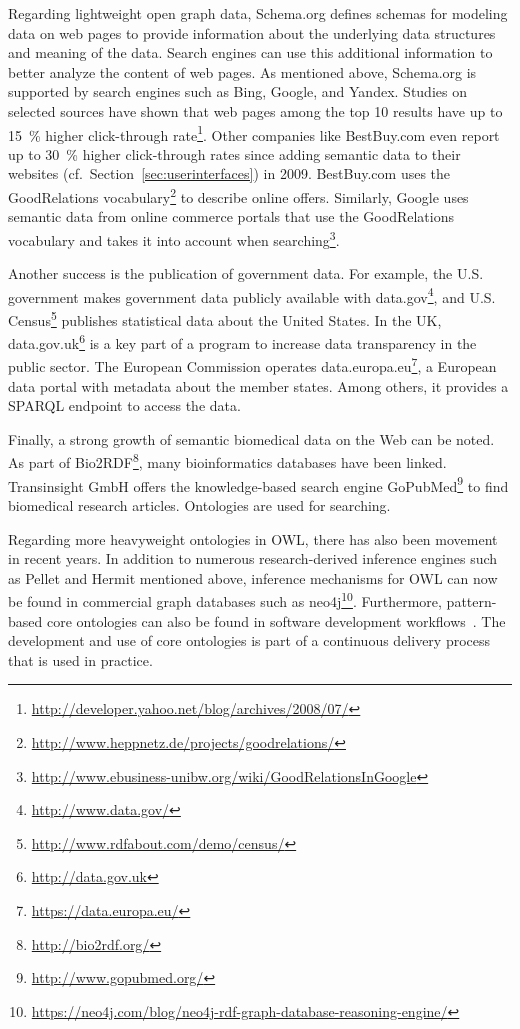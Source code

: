\documentclass[a4paper,USenglish]{tgdk-v2021}
\newcommand{\myurl}[1]{\footnote{\url{#1}}}
\begin{document}
Regarding lightweight open graph data, Schema.org defines schemas for modeling data on web pages to provide information about the underlying data structures and meaning of the data.
Search engines can use this additional information to better analyze the content of web pages.
As mentioned above, Schema.org is supported by search engines such as Bing, Google, and Yandex. 
Studies on selected sources have shown that web pages among the top 10 results have up to 15~\% higher click-through rate\footnote{\url{http://developer.yahoo.net/blog/archives/2008/07/}}.
Other companies like BestBuy.com even report up to 30~\% higher click-through rates since adding semantic data to their websites (cf.~Section~\ref{sec:userinterfaces}) in 2009.
BestBuy.com uses the GoodRelations vocabulary\myurl{http://www.heppnetz.de/projects/goodrelations/} to describe online offers.
Similarly, Google uses semantic data from online commerce portals that use the GoodRelations vocabulary and takes it into account when searching\footnote{\url{http://www.ebusiness-unibw.org/wiki/GoodRelationsInGoogle}}. 

Another success is the publication of government data.
For example, the U.S. government makes government data publicly available with data.gov\myurl{http://www.data.gov/}, and U.S. Census\myurl{http://www.rdfabout.com/demo/census/} publishes statistical data about the United States.
In the UK, data.gov.uk\myurl{http://data.gov.uk} is a key part of a program to increase data transparency in the public sector.
The European Commission operates data.europa.eu\myurl{https://data.europa.eu/}, a European data portal with metadata about the member states.
Among others, it provides a SPARQL endpoint to access the data.

Finally, a strong growth of semantic biomedical data on the Web can be noted.
As part of Bio2RDF\myurl{http://bio2rdf.org/}, many bioinformatics databases have been linked.
Transinsight GmbH offers the knowledge-based search engine GoPubMed\myurl{http://www.gopubmed.org/} to find biomedical research articles.
Ontologies are used for searching.

Regarding more heavyweight ontologies in OWL, there has also been movement in recent years. 
In addition to numerous research-derived inference engines such as Pellet and Hermit mentioned above, inference mechanisms for OWL can now be found in commercial graph databases such as neo4j\footnote{\url{https://neo4j.com/blog/neo4j-rdf-graph-database-reasoning-engine/}}.
Furthermore, pattern-based core ontologies can also be found in software development workflows~\cite{DBLP:conf/semweb/SchonteichKS18}.
The development and use of core ontologies is part of a continuous delivery process that is used in practice.
\end{document}
